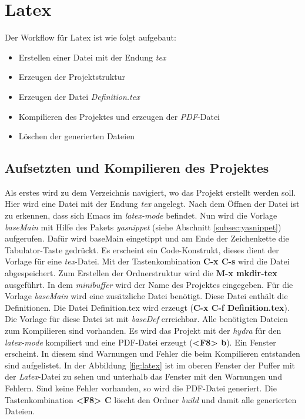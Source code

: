 \section{Latex}
\label{sec:latex}
Der Workflow für Latex ist wie folgt aufgebaut:
\begin{itemize}
\item Erstellen einer Datei mit der Endung \textit{tex}
\item Erzeugen der Projektstruktur
\item Erzeugen der Datei \textit{Definition.tex}
\item Kompilieren des Projektes und erzeugen der \textit{PDF}-Datei
\item Löschen der generierten Dateien
\end{itemize}

\subsection{Aufsetzten und Kompilieren des Projektes}
\label{subsec:prolatex}
Als erstes wird zu dem Verzeichnis navigiert, wo das Projekt erstellt
werden soll. Hier wird eine Datei mit der Endung \textit{tex}
angelegt. Nach dem Öffnen der Datei ist zu erkennen, dass sich Emacs
im \textit{latex-mode} befindet. Nun wird die Vorlage
\textit{baseMain} mit Hilfe des Pakets \textit{yasnippet} (siehe
Abschnitt \ref{subsec:yasnippet}) aufgerufen. Dafür wird
{\glqq}baseMain{\grqq} eingetippt und am Ende der Zeichenkette die
Tabulator-Taste gedrückt. Es erscheint ein Code-Konstrukt, dieses
dient der Vorlage für eine \textit{tex}-Datei. Mit der
Tastenkombination \textbf{C-x C-s} wird die Datei abgespeichert. Zum
Erstellen der Ordnerstruktur wird die \textbf{M-x mkdir-tex}
ausgeführt. In dem \textit{minibuffer} wird der Name des Projektes
eingegeben. Für die Vorlage \textit{baseMain} wird eine zusätzliche
Datei benötigt. Diese Datei enthält die Definitionen. Die Datei
{\glqq}Definition.tex{\grqq} wird erzeugt (\textbf{C-x C-f
  Definition.tex}). Die Vorlage für diese Datei ist mit
\textit{baseDef} erreichbar. Alle benötigten Dateien zum Kompilieren
sind vorhanden. Es wird das Projekt mit der \textit{hydra} für den
\textit{latex-mode} kompiliert und eine PDF-Datei erzeugt
(\textbf{<F8> b}). Ein Fenster erscheint. In diesem sind Warnungen und
Fehler die beim Kompilieren entstanden sind aufgelistet. In der
Abbildung \ref{fig:latex} ist im oberen Fenster der Puffer mit der
\textit{Latex}-Datei zu sehen und unterhalb das Fenster mit den
Warnungen und Fehlern. Sind keine Fehler vorhanden, so wird die
PDF-Datei generiert. Die Tastenkombination \textbf{<F8> C} löscht den
Ordner \textit{build} und damit alle generierten Dateien.\\

